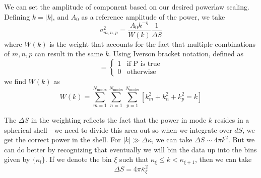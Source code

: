 \documentclass[11pt]{article}
\begin{document}
We can set the amplitude of component based on our desired
powerlaw scaling.  Defining $k = |k|$, and $A_0$ as a
reference amplitude of the power, we take
\begin{equation}
a_{m,n,p}^2 = \frac{A_0 k^{-\eta}}{W(k)} \frac{1}{\Delta S}
\end{equation}
where $W(k)$ is the weight that accounts for the fact that multiple
combinations of $m, n, p$ can result in the same $k$.  Using Iverson bracket
notation, defined as
\begin{equation}
[P] = \begin{cases}
  1 & \text{if P is true} \\
  0 & \text{otherwise}
      \end{cases}
\end{equation}
we find $W(k)$ as
\begin{equation}
W(k) = \sum_{m=1}^{N_\mathrm{modes}}
       \sum_{n=1}^{N_\mathrm{modes}} 
       \sum_{p=1}^{N_\mathrm{modes}} [ k_m^2 + k_n^2 + k_p^2 = k ]
\end{equation}

The $\Delta S$ in the weighting reflects the fact that the power 
in mode $k$ resides in a spherical shell---we need to divide this
area out so when we integrate over $dS$, we get the correct power
in the shell.  For $|k| \gg \Delta \kappa$, we can take $\Delta S \sim
4\pi k^2$.  But we can do better by recognizing that eventually we
will bin the data up into the bins given by $\{\kappa_l\}$.  If we
denote the bin $\xi$ such that $\kappa_\xi \le k < \kappa_{\xi+1}$,
then we can take
\begin{equation}
\Delta S = 4 \pi \bar{\kappa}_\xi^2
\end{equation}
\end{document}
